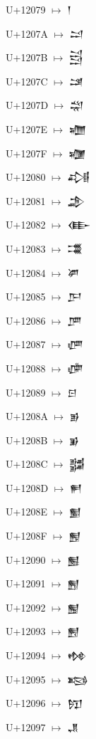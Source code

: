 {\noindent U+12079  $\mapsto$ {\cufont 𒁹}\par
\noindent U+1207A  $\mapsto$ {\cufont 𒁺}\par
\noindent U+1207B  $\mapsto$ {\cufont 𒁻}\par
\noindent U+1207C  $\mapsto$ {\cufont 𒁼}\par
\noindent U+1207D  $\mapsto$ {\cufont 𒁽}\par
\noindent U+1207E  $\mapsto$ {\cufont 𒁾}\par
\noindent U+1207F  $\mapsto$ {\cufont 𒁿}\par
\noindent U+12080  $\mapsto$ {\cufont 𒂀}\par
\noindent U+12081  $\mapsto$ {\cufont 𒂁}\par
\noindent U+12082  $\mapsto$ {\cufont 𒂂}\par
\noindent U+12083  $\mapsto$ {\cufont 𒂃}\par
\noindent U+12084  $\mapsto$ {\cufont 𒂄}\par
\noindent U+12085  $\mapsto$ {\cufont 𒂅}\par
\noindent U+12086  $\mapsto$ {\cufont 𒂆}\par
\noindent U+12087  $\mapsto$ {\cufont 𒂇}\par
\noindent U+12088  $\mapsto$ {\cufont 𒂈}\par
\noindent U+12089  $\mapsto$ {\cufont 𒂉}\par
\noindent U+1208A  $\mapsto$ {\cufont 𒂊}\par
\noindent U+1208B  $\mapsto$ {\cufont 𒂋}\par
\noindent U+1208C  $\mapsto$ {\cufont 𒂌}\par
\noindent U+1208D  $\mapsto$ {\cufont 𒂍}\par
\noindent U+1208E  $\mapsto$ {\cufont 𒂎}\par
\noindent U+1208F  $\mapsto$ {\cufont 𒂏}\par
\noindent U+12090  $\mapsto$ {\cufont 𒂐}\par
\noindent U+12091  $\mapsto$ {\cufont 𒂑}\par
\noindent U+12092  $\mapsto$ {\cufont 𒂒}\par
\noindent U+12093  $\mapsto$ {\cufont 𒂓}\par
\noindent U+12094  $\mapsto$ {\cufont 𒂔}\par
\noindent U+12095  $\mapsto$ {\cufont 𒂕}\par
\noindent U+12096  $\mapsto$ {\cufont 𒂖}\par
\noindent U+12097  $\mapsto$ {\cufont 𒂗}\par
}
